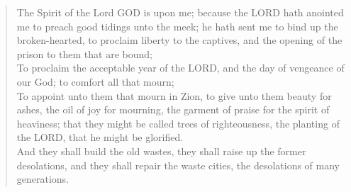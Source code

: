 \documentclass[MAIN]{subfiles}
\begin{document}
\begin{verse}
The Spirit of the Lord {\hge GOD} is upon me; because the {\hge LORD} hath anointed me to preach good tidings unto the meek; he hath sent me to bind up the broken-hearted, to proclaim liberty to the captives, and the opening of the prison to them that are bound;\\
To proclaim the acceptable year of the {\hge LORD}, and the day of vengeance of our God; to comfort all that mourn;\\
To appoint unto them that mourn in {\hge Zion}, to give unto them beauty for ashes, the oil of joy for mourning, the garment of praise for the spirit of heaviness; that they might be called trees of righteousness, the planting of the {\hge LORD}, that he might be glorified.\\
And they shall build the old wastes, they shall raise up the former desolations, and they shall repair the waste cities, the desolations of many generations.
\end{verse}
\end{document}
